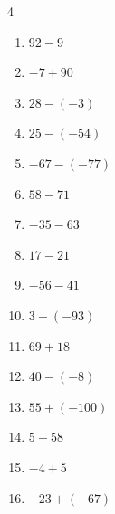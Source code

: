 \begin{multicols}{4}
\begin{enumerate}
        \phantom{$=-48$}

  \item $92-9$

        \phantom{$=83$}

  \item $-7+90$

        \phantom{$=83$}

  \item $28-(-3)$

        \phantom{$=31$}

  \item $25-(-54)$

        \phantom{$=79$}

  \item $-67-(-77)$

        \phantom{$=10$}

  \item $58-71$

        \phantom{$=-13$}

  \item $-35-63$

        \phantom{$=-98$}

  \item $17-21$

        \phantom{$=-4$}

  \item $-56-41$

        \phantom{$=-97$}

  \item $3+(-93)$

        \phantom{$=-90$}

  \item $69+18$

        \phantom{$=87$}

  \item $40-(-8)$

        \phantom{$=48$}

  \item $55+(-100)$

        \phantom{$=-45$}

  \item $5-58$

        \phantom{$=-53$}

  \item $-4+5$

        \phantom{$=1$}

\columnbreak %

  \item $-23+(-67)$


\end{enumerate}
\end{multicols}
